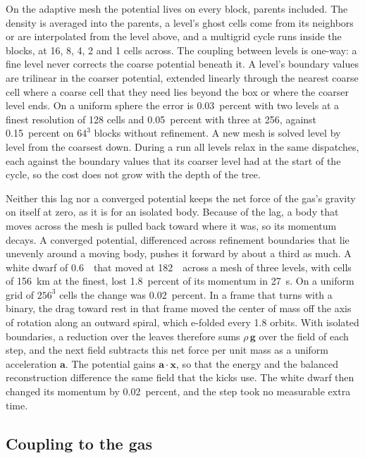 \documentclass[twocolumn]{aastex701}
\begin{document}
On the adaptive mesh the potential lives on every block, parents included. The density is averaged into the parents, a level's ghost cells come from its neighbors or are interpolated from the level above, and a multigrid cycle runs inside the blocks, at 16, 8, 4, 2 and 1 cells across. The coupling between levels is one-way: a fine level never corrects the coarse potential beneath it. A level's boundary values are trilinear in the coarser potential, extended linearly through the nearest coarse cell where a coarse cell that they need lies beyond the box or where the coarser level ends. On a uniform sphere the error is 0.03~percent with two levels at a finest resolution of 128 cells and 0.05~percent with three at 256, against 0.15~percent on $64^3$ blocks without refinement. A new mesh is solved level by level from the coarsest down. During a run all levels relax in the same dispatches, each against the boundary values that its coarser level had at the start of the cycle, so the cost does not grow with the depth of the tree.

Neither this lag nor a converged potential keeps the net force of the gas's gravity on itself at zero, as it is for an isolated body. Because of the lag, a body that moves across the mesh is pulled back toward where it was, so its momentum decays. A converged potential, differenced across refinement boundaries that lie unevenly around a moving body, pushes it forward by about a third as much. A white dwarf of 0.6~\Msun\ that moved at 182~\kms\ across a mesh of three levels, with cells of 156~km at the finest, lost 1.8~percent of its momentum in 27~s. On a uniform grid of $256^3$ cells the change was 0.02~percent. In a frame that turns with a binary, the drag toward rest in that frame moved the center of mass off the axis of rotation along an outward spiral, which e-folded every 1.8 orbits. With isolated boundaries, a reduction over the leaves therefore sums $\rho\,\mathbf{g}$ over the field of each step, and the next field subtracts this net force per unit mass as a uniform acceleration $\mathbf{a}$. The potential gains $\mathbf{a}\cdot\mathbf{x}$, so that the energy and the balanced reconstruction difference the same field that the kicks use. The white dwarf then changed its momentum by 0.02~percent, and the step took no measurable extra time.

\subsection{Coupling to the gas}
\label{sec:coupling}
\end{document}
